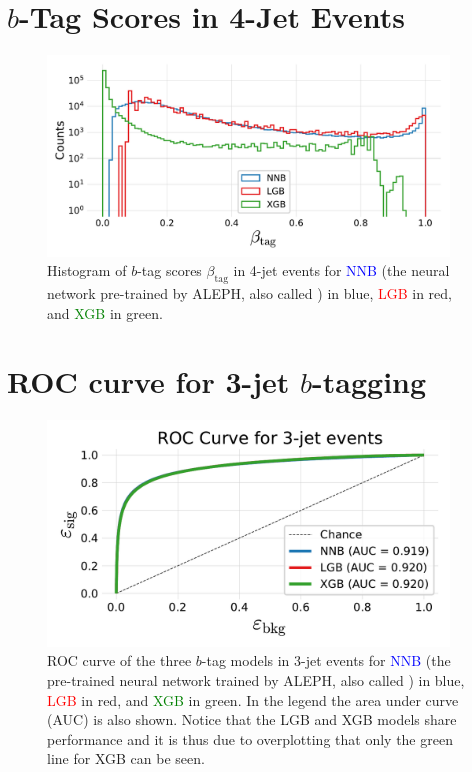 \section[b-Tag Scores in 4-Jet Events]{$b$-Tag Scores in 4-Jet Events}
\begin{figure}
  \includegraphics[width=0.95\textwidth, trim=0 0 0 30, clip]{figures/quarks/y_pred_4_jet_hist-down_sample=1.00-ML_vars=vertex-selection=b-ejet_min=4-n_iter_RS_lgb=99-n_iter_RS_xgb=9-cdot_cut=0.90-version=19.pdf}
  \caption[$b$-Tag Scores in 4-Jet Events]
          {Histogram of $b$-tag scores $\beta_\mathrm{tag}$ in 4-jet events for \textcolor{blue}{NNB} (the neural network pre-trained by ALEPH, also called ) in blue, \textcolor{red}{LGB} in red, and \textcolor{green}{XGB} in green. 
          } 
\end{figure}
\clearpage

\FloatBarrier
\section[ROC curve for 3-jet b-tagging]{ROC curve for 3-jet $b$-tagging}
\begin{figure}
  \includegraphics[width=0.95\textwidth, trim=10 10 10 40, clip]{figures/quarks/ROC_3_jet-down_sample=1.00-ML_vars=vertex-selection=b-ejet_min=4-n_iter_RS_lgb=99-n_iter_RS_xgb=9-cdot_cut=0.90-version=19.pdf}
  \vspace{-0.5cm}
  \caption[ROC curve for 3-jet $b$-tagging]
          {ROC curve of the three $b$-tag models in 3-jet events for \textcolor{blue}{NNB} (the pre-trained neural network trained by ALEPH, also called ) in blue, \textcolor{red}{LGB} in red, and \textcolor{green}{XGB} in green. In the legend the area under curve (AUC) is also shown. Notice that the LGB and XGB models share performance and it is thus due to overplotting that only the green line for XGB can be seen.} 
  \label{fig:q:roc_btag_3j}
\end{figure}
\vspace{3cm}
